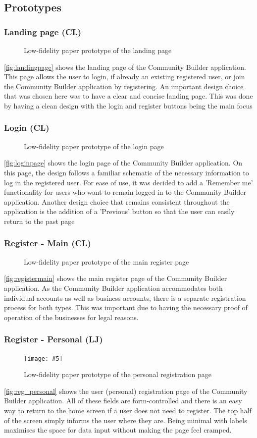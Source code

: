 \documentclass[a4paper,12pt]{article}
\newcommand{\includescalefigure}[5]{
\begin{figure}[H]
\centering
\texttt{[image: \#5]}
\captionsetup{width=.8\linewidth} 
\caption[#2]{#3}
\label{#1}
\end{figure}
}
\newcommand{\ciaraincludescalefigure}[5]{
\begin{figure}[H]
\centering
\rotatebox[origin=c]{270}{\texttt{[image: \#5]}}
\captionsetup{width=.8\linewidth} 
\caption[#2]{#3}
\label{#1}
\end{figure}
}
\begin{document}
\subsection{Prototypes}
\subsubsection{Landing page (CL)}
\ciaraincludescalefigure{fig:landingpage}{Landing Page Paper Prototype}{Low-fidelity paper prototype of the landing page}{1}{prototypes/landingpage.png}
\autoref{fig:landingpage} shows the landing page of the Community Builder application. This page allows the user to login, if already an existing registered user, or join the Community Builder application by registering. An important design choice that was chosen here was to have a clear and concise landing page. This was done by having a clean design with the login and register buttons being the main focus
\subsubsection{Login (CL)}
\ciaraincludescalefigure{fig:loginpage}{Login Page Paper Prototype}{Low-fidelity paper prototype of the login page}{0.9}{prototypes/login.png}
\autoref{fig:loginpage} shows the login page of the Community Builder application. On this page, the design follows a familiar schematic of the necessary information to log in the registered user. For ease of use, it was decided to add a 'Remember me' functionality for users who want to remain logged in to the Community Builder application. Another design choice that remains consistent throughout the application is the addition of a 'Previous' button so that the user can easily return to the past page
\subsubsection{Register - Main (CL)}
\ciaraincludescalefigure{fig:registermain}{Main Register Page Paper Prototype}{Low-fidelity paper prototype of the main register page}{0.9}{prototypes/registermain.png}
\autoref{fig:registermain} shows the main register page of the Community Builder application. As the Community Builder application accommodates both individual accounts as well as business accounts, there is a separate registration process for both types. This was important due to having the necessary proof of operation of the businesses for legal reasons. 
\subsubsection{Register - Personal (LJ)}
\includescalefigure{fig:reg_personal}{Personal Registration Paper Prototype}{Low-fidelity paper prototype of the personal registration page}{1}{prototypes/register_personal.PNG}
\autoref{fig:reg_personal} shows the user (personal) registration page of the Community Builder application. All of these fields are form-controlled and there is an easy way to return to the home screen if a user does not need to register. The top half of the screen simply informs the user where they are. Being minimal with labels maximises the space for data input without making the page feel cramped.
\end{document}
